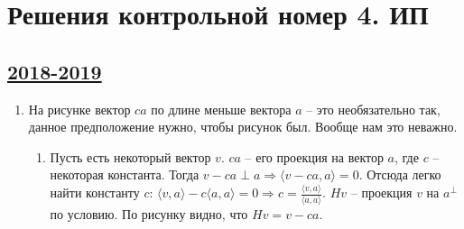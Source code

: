\thispagestyle{empty}
\section{Решения контрольной номер 4. ИП}




\subsection[2018-2019]{\hyperref[sec:kr_04_ip_2018_2019]{2018-2019}}
\label{sec:sol_kr_04_ip_2018_2019}
\begin{enumerate}
\item
{}

На рисунке вектор $ca$ по длине меньше вектора $a$ -- это необязательно так, данное предположение нужно, чтобы рисунок был. Вообще нам это неважно.
\begin{enumerate}
	\item
	Пусть есть некоторый вектор $v$. $ca$ -- его проекция на вектор $a$, где $c$ -- некоторая константа. Тогда $v - ca \perp a \Rightarrow \langle v - ca, a \rangle = 0$. Отсюда легко найти константу $c$: $\langle v,a \rangle - c \langle a, a \rangle = 0 \Rightarrow c = \frac{\langle v,a \rangle}{\langle a,a \rangle}$. $Hv$ -- проекция $v$ на $a^{\perp}$ по условию. По рисунку видно, что $Hv = v - ca$.
	

\end{enumerate}
\end{enumerate}
